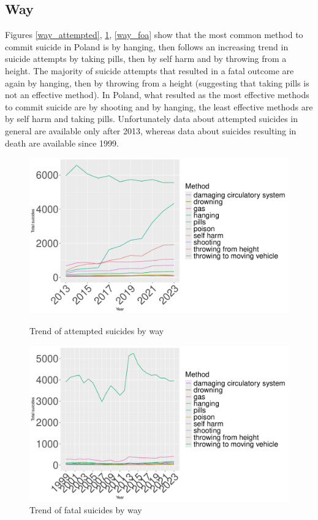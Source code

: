 \documentclass{article}
\begin{document}
\subsection{Way}
Figures \ref{way_attempted}, \ref{way_fatal}, \ref{way_foa}
show that the most common method to commit suicide in Poland is by hanging,
then follows an increasing trend in suicide attempts by taking pills,
then by self harm and by throwing from a height.
The majority of suicide attempts that resulted in a fatal outcome are 
again by hanging, then by throwing from a height (suggesting that taking pills
is not an effective method).
In Poland, what resulted as the most effective methods to commit suicide
are by shooting and by hanging, the least effective methods are by self harm
and taking pills.
Unfortunately data about attempted suicides in general are available only after 2013,
whereas data about suicides resulting in death are available since 1999. 
\begin{figure}[H]
    \centering
    \begin{minipage}{0.45\textwidth}
        \includegraphics[width=\textwidth]{imgs/way_attempted.pdf}
        \caption{Trend of attempted suicides by way }
	\label{way_attempted}
    \end{minipage}
    \hfill
    \begin{minipage}{0.45\textwidth}
        \includegraphics[width=\textwidth]{imgs/way_fatal.pdf}
        \caption{Trend of fatal suicides by way }
	\label{way_fatal}
    \end{minipage}
\end{figure}
\end{document}
